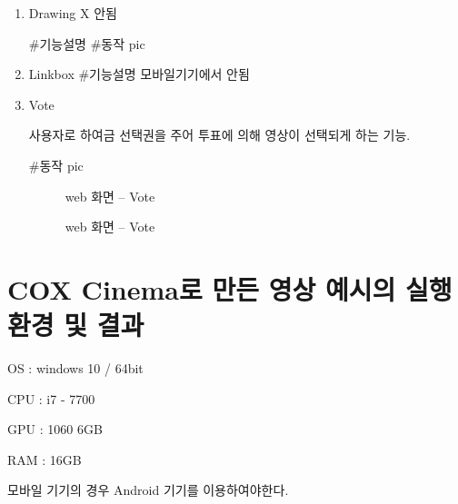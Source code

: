 \documentclass{oblivoir}
\begin{document}
\begin{enumerate}
    \item Drawing X 안됨

#기능설명
#동작 pic


    \item Linkbox
#기능설명 모바일기기에서 안됨

    \item Vote

사용자로 하여금 선택권을 주어 투표에 의해 영상이 선택되게 하는 기능.

#동작 pic

\begin{figure}[h!]
    \centering
    \caption{web 화면 – Vote}
\end{figure} 


\begin{figure}[h!]
    \centering
    \caption{web 화면 – Vote}
\end{figure} 


\end{enumerate}

\section{ COX Cinema로 만든 영상 예시의 실행환경 및 결과 }


OS : windows 10 / 64bit

CPU : i7 - 7700

GPU : 1060 6GB

RAM : 16GB

모바일 기기의 경우 Android 기기를 이용하여야한다.

\end{document}
